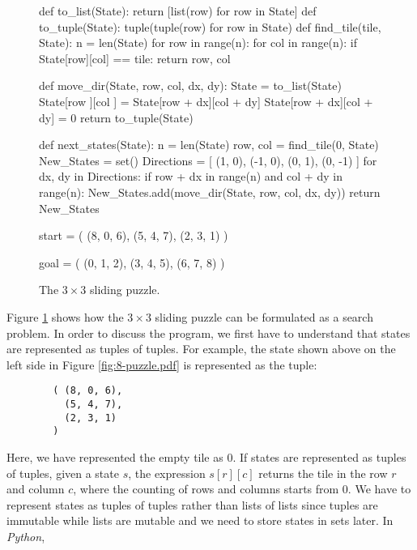 \begin{figure}[!ht]
\centering
\begin{python3code}
    def to_list(State):
        return [list(row) for row in State]
    def to_tuple(State):
        tuple(tuple(row) for row in State)
    def find_tile(tile, State):
        n = len(State)
        for row in range(n):
            for col in range(n):
                if State[row][col] == tile:
                    return row, col
    
    def move_dir(State, row, col, dx, dy):
        State = to_list(State)
        State[row     ][col     ] = State[row + dx][col + dy]
        State[row + dx][col + dy] = 0
        return to_tuple(State)
    
    def next_states(State):
        n          = len(State)
        row, col   = find_tile(0, State)
        New_States = set()
        Directions = [ (1, 0), (-1, 0), (0, 1), (0, -1) ]
        for dx, dy in Directions:
            if row + dx in range(n) and col + dy in range(n):
                New_States.add(move_dir(State, row, col, dx, dy))
        return New_States
    
    start = ( (8, 0, 6),
              (5, 4, 7),
              (2, 3, 1)
            )

    goal = ( (0, 1, 2), 
             (3, 4, 5), 
             (6, 7, 8)
           )
\end{python3code}
\vspace*{-0.3cm}
\caption{The $3 \times 3$ sliding puzzle.}
\label{fig:Sliding-Puzzle.ipynb}
\end{figure}
Figure \ref{fig:Sliding-Puzzle.ipynb} shows how the $3 \times 3$ sliding puzzle can be formulated as
a search problem.  In order to discuss the program, we first have to understand that states are
represented as tuples of tuples.  For example, the state shown above on the left side in Figure
\ref{fig:8-puzzle.pdf} is represented as the tuple:
\begin{verbatim}
        ( (8, 0, 6),
          (5, 4, 7),
          (2, 3, 1)
        )
\end{verbatim}
Here, we have represented the empty tile as $0$.
If states are represented as tuples of tuples, given a state $s$, the expression $s[r][c]$ returns the tile in
the row $r$ and column $c$, where the counting of rows and columns starts from $0$.
We have to represent states as tuples of tuples rather than lists of lists since
tuples are immutable while lists are mutable and we need to store states in sets later.  In \textsl{Python},
